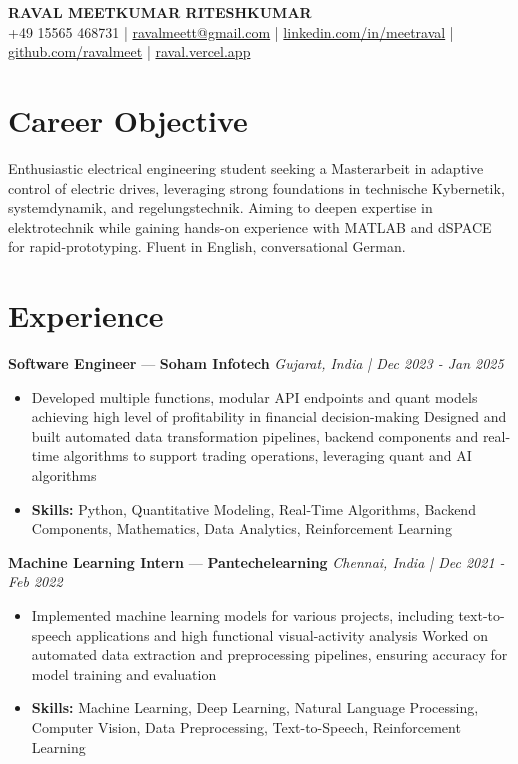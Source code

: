 \documentclass[a4paper,10pt]{article}
\begin{document}
\begin{center}
  {\Large\bfseries RAVAL MEETKUMAR RITESHKUMAR}\\[2pt]
  {\small +49 15565 468731 \;|\; \href{mailto:ravalmeett@gmail.com}{ravalmeett@gmail.com} \;|\; \href{https://www.linkedin.com/in/meetraval/}{linkedin.com/in/meetraval} \;|\; \href{https://github.com/ravalmeet}{github.com/ravalmeet} \;|\; \href{https://raval.vercel.app/}{raval.vercel.app}}
\end{center}
\vspace{-3pt}

\section*{Career Objective}
Enthusiastic electrical engineering student seeking a Masterarbeit in adaptive control of electric drives, leveraging strong foundations in technische Kybernetik, systemdynamik, and regelungstechnik. Aiming to deepen expertise in elektrotechnik while gaining hands-on experience with MATLAB and dSPACE for rapid-prototyping. Fluent in English, conversational German.\par

\section*{Experience}
\textbf{Software Engineer} — \textbf{Soham Infotech} \hfill \textit{Gujarat, India \;|\; Dec 2023 - Jan 2025}\par
\vspace{1pt}
\begin{itemize}
  \item Developed multiple functions, modular API endpoints and quant models achieving high level of profitability in financial decision-making Designed and built automated data transformation pipelines, backend components and real-time algorithms to support trading operations, leveraging quant and AI algorithms
  \item \textbf{Skills:} Python, Quantitative Modeling, Real-Time Algorithms, Backend Components, Mathematics, Data Analytics, Reinforcement Learning
\end{itemize}
\vspace{3pt}
\textbf{Machine Learning Intern} — \textbf{Pantechelearning} \hfill \textit{Chennai, India \;|\; Dec 2021 - Feb 2022}\par
\vspace{1pt}
\begin{itemize}
  \item Implemented machine learning models for various projects, including text-to-speech applications and high functional visual-activity analysis Worked on automated data extraction and preprocessing pipelines, ensuring accuracy for model training and evaluation
  \item \textbf{Skills:} Machine Learning, Deep Learning, Natural Language Processing, Computer Vision, Data Preprocessing, Text-to-Speech, Reinforcement Learning
\end{itemize}
\end{document}
